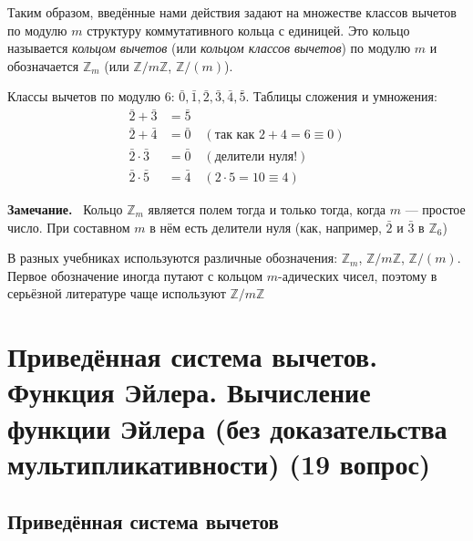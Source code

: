 \documentclass[a4paper,12pt]{article}
\newcommand{\myremark}{\textbf{Замечание.}\ }
\theoremstyle{definition}
\theoremstyle{plain}
\theoremstyle{remark}
\begin{document}
	\begin{tcolorbox}[colback=red!5, colframe=red!70!black, title=Итог]
		Таким образом, введённые нами действия задают на множестве классов вычетов по модулю $m$ структуру коммутативного кольца с единицей. Это кольцо называется \textit{кольцом вычетов} (или \textit{кольцом классов вычетов}) по модулю $m$ и обозначается $\mathbb{Z}_m$ (или $\mathbb{Z}/m\mathbb{Z}$, $\mathbb{Z}/(m)$).
	\end{tcolorbox}
	
	\begin{tcolorbox}[colback=gray!5, colframe=gray!50, title=Пример: $\mathbb{Z}_6$]
		Классы вычетов по модулю $6$: $\bar{0}, \bar{1}, \bar{2}, \bar{3}, \bar{4}, \bar{5}$.
		Таблицы сложения и умножения:
		\begin{align*}
			\bar{2} + \bar{3} &= \bar{5} \\
			\bar{2} + \bar{4} &= \bar{0} \quad (\text{так как } 2+4=6 \equiv 0) \\
			\bar{2} \cdot \bar{3} &= \bar{0} \quad (\text{делители нуля!}) \\
			\bar{2} \cdot \bar{5} &= \bar{4} \quad (2\cdot5=10 \equiv 4)
		\end{align*}
	\end{tcolorbox}
	
	\myremark
	Кольцо $\mathbb{Z}_m$ является полем тогда и только тогда, когда $m$ — простое число. При составном $m$ в нём есть делители нуля (как, например, $\bar{2}$ и $\bar{3}$ в $\mathbb{Z}_6$)
	
	\begin{tcolorbox}[colback=purple!5, colframe=purple!50!black, title=Заметочка: Обозначения]
		В разных учебниках используются различные обозначения: $\mathbb{Z}_m$, $\mathbb{Z}/m\mathbb{Z}$, $\mathbb{Z}/(m)$. Первое обозначение иногда путают с кольцом $m$-адических чисел, поэтому в серьёзной литературе чаще используют $\mathbb{Z}/m\mathbb{Z}$
	\end{tcolorbox}
	
	
	
	
	\newpage
	\section{Приведённая система вычетов. Функция Эйлера. Вычисление функции Эйлера (без доказательства мультипликативности) (19 вопрос)}
	
	\subsection{Приведённая система вычетов}
	
\end{document}
